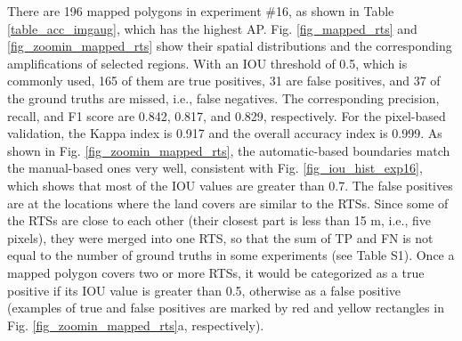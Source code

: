 \documentclass[authoryear,preprint,review,12pt]{elsarticle}
\begin{document}
There are 196 mapped polygons in experiment \#16, as shown in Table \ref{table_acc_imgaug}, which has the highest AP.  Fig. \ref{fig_mapped_rts} and \ref{fig_zoomin_mapped_rts} show their spatial distributions and the corresponding ampliﬁcations of selected regions. With an IOU threshold of 0.5, which is commonly used, 165 of them are true positives, 31 are false positives, and 37 of the ground truths are missed, i.e., false negatives. The corresponding precision, recall, and F1 score are 0.842, 0.817, and 0.829, respectively. For the pixel-based validation, the Kappa index is 0.917 and the overall accuracy index is 0.999. As shown in Fig. \ref{fig_zoomin_mapped_rts}, the automatic-based boundaries match the manual-based ones very well, consistent with Fig. \ref{fig_iou_hist_exp16}, which shows that most of the IOU values are greater than 0.7. The false positives are at the locations where the land covers are similar to the RTSs. Since some of the RTSs are close to each other (their closest part is less than 15 m, i.e., five pixels), they were merged into one RTS,
so that the sum of TP and FN is not equal to the number of ground truths in some experiments (see Table S1). Once a mapped polygon covers two or more RTSs, it would be categorized as a true positive if its IOU value is greater than 0.5, otherwise as a false positive (examples of true and false positives are marked by red and yellow rectangles in Fig. \ref{fig_zoomin_mapped_rts}a, respectively). 

\end{document}
